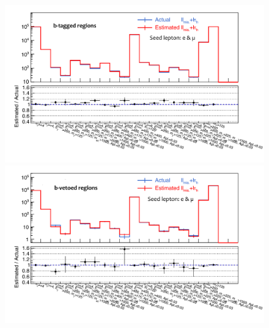 \begin{figure}[htbp]
  \begin{center}
    \includegraphics[width=160mm]{figures/BGestimation/ObjReplacement/mcClosure_ATLASNote/All_emu/All_emu_regionYieldsBT__trMode4_NoSys_noATLASLabel.pdf}
    \label{fig::BGestimation::objRep::mcClosure::MisLepTauRep_regionYieldsBT}
    \includegraphics[width=160mm]{figures/BGestimation/ObjReplacement/mcClosure_ATLASNote/All_emu/All_emu_regionYieldsBV__trMode4_NoSys_noATLASLabel.pdf}
    \label{fig::BGestimation::objRep::mcClosure::MisLepTauRep_regionYieldsBV}
  \end{center}
\end{figure}

